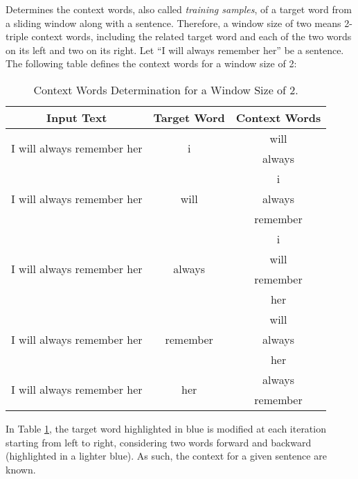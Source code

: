 \begin{definition}
  Determines the context words, also called \emph{training samples}, of a target
  word from a sliding window along with a sentence. Therefore, a window size of
  two means 2-triple context words, including the related target word and each of
  the two words on its left and two on its right. Let ``I will always remember
  her'' be a sentence. The following table defines the context words for a window
  size of 2:
  \begin{table}[!ht]
    \centering
    \caption{Context Words Determination for a Window Size of 2. }
    \label{tab:window:size}
    \begin{tabular}{ccc}
      \toprule
      \textbf{Input Text} & \textbf{Target Word} & \textbf{Context Words} \\
      \midrule
      \multirow{2}{*}{\colorbox{blue!25}{I} \colorbox{myblue!25}{will} \colorbox{myblue!25}{always} remember her} & \multirow{2}{*}{i} & will \\
               & & always \\[1.2ex]
      \multirow{3}{*}{\colorbox{myblue!25}{I} \colorbox{blue!25}{will} \colorbox{myblue!25}{always} \colorbox{myblue!25}{remember} her} & \multirow{3}{*}{will} & i \\
                          & & always \\
                          & & remember \\[1.2ex]
      \multirow{4}{*}{\colorbox{myblue!25}{I} \colorbox{myblue!25}{will} \colorbox{blue!25}{always} \colorbox{myblue!25}{remember} \colorbox{myblue!25}{her}} & \multirow{4}{*}{always} & i \\
                          & & will \\
                          & & remember \\
                          & & her \\[1.2ex]
      \multirow{3}{*}{I \colorbox{myblue!25}{will} \colorbox{myblue!25}{always} \colorbox{blue!25}{remember} \colorbox{myblue!25}{her}} & \multirow{3}{*}{remember} & will \\
                          & & always \\
                          & & her \\[1.2ex]
      \multirow{2}{*}{I will \colorbox{myblue!25}{always} \colorbox{myblue!25}{remember} \colorbox{blue!25}{her}} & \multirow{2}{*}{her} & always \\
                          & & remember \\
      \bottomrule
    \end{tabular}
  \end{table}

  In Table \ref{tab:window:size}, the target word highlighted in blue is
  modified at each iteration starting from left to right, considering two words
  forward and backward (highlighted in a lighter blue). As such, the context for a
  given sentence are known.
  \label{def:window:size}
\end{definition}


